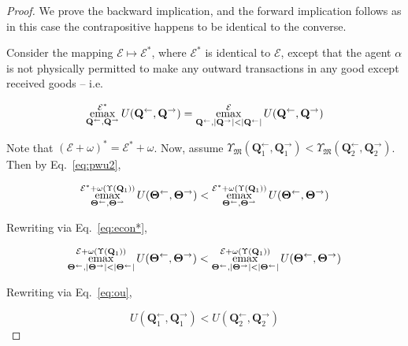 \documentclass[smallextended]{svjour3}
\newcommand{\economy}{\ensuremath{\mathcal{E}}}
\newcommand{\emax}{\ensuremath{\operatornamewithlimits{emax}}}
\newcommand{\quantl}{\ensuremath{\mathbf{Q}}} %
\newcommand{\quantg}{\ensuremath{\mathbf{\Theta}}} %
\newcommand{\agenta}{\ensuremath{\alpha}}
\newcommand{\agentz}{\ensuremath{\omega}}
\newcommand{\money}{\ensuremath{\mathfrak{M}}}
\newcommand{\utility}{\ensuremath{U}}
\newcommand{\outility}{\ensuremath{\Upsilon}}
\begin{document}
\begin{proof}
    We prove the backward implication, and the forward implication follows as in this case the contrapositive happens to be identical to the converse.
    
    Consider the mapping $\economy\mapsto\economy^*$, where $\economy^*$ is identical to $\economy$, except that the agent $\agenta$ is not physically permitted to make any outward transactions in any good except received goods -- i.e.
    
    \begin{equation}
        \label{eq:econ*}
        \emax\limits_{\quantl^\leftarrow, \quantl^\rightarrow}^{\economy^*} \utility(\quantl^\leftarrow, \quantl^\rightarrow) = 
        \emax\limits_{\quantl^\leftarrow, |\quantl^\rightarrow|<|\quantl^\leftarrow|}^{\economy} \utility(\quantl^\leftarrow, \quantl^\rightarrow)
    \end{equation}
    
    Note that $(\economy + \agentz)^* = \economy^* + \agentz$. Now, assume $\outility_\money(\quantl_1^\leftarrow, \quantl_1^\rightarrow)<\outility_\money(\quantl_2^\leftarrow, \quantl_2^\rightarrow)$. Then by Eq.~\ref{eq:pwu2}, 
    
    \begin{equation*}
        \emax\limits_{\quantg^\leftarrow, \quantg^\rightarrow}^{\economy^* + \agentz(\outility(\quantl_1))} \utility(\quantg^\leftarrow, \quantg^\rightarrow) < \emax\limits_{\quantg^\leftarrow, \quantg^\rightarrow}^{\economy^*+\agentz(\outility(\quantl_1))} \utility(\quantg^\leftarrow, \quantg^\rightarrow)
    \end{equation*}
    
    Rewriting via Eq.~\ref{eq:econ*}, 
    
    \begin{equation*}
        \emax\limits_{\quantg^\leftarrow, |\quantg^\rightarrow|<|\quantg^\leftarrow|}^{\economy + \agentz(\outility(\quantl_1))} \utility(\quantg^\leftarrow, \quantg^\rightarrow) < \emax\limits_{\quantg^\leftarrow, |\quantg^\rightarrow|<|\quantg^\leftarrow|}^{\economy+\agentz(\outility(\quantl_1))} \utility(\quantg^\leftarrow, \quantg^\rightarrow)
    \end{equation*}
    
    Rewriting via Eq.~\ref{eq:ou},
    
    \begin{equation*}
        \utility(\quantl_1^\leftarrow, \quantl_1^\rightarrow) < \utility(\quantl_2^\leftarrow, \quantl_2^\rightarrow) 
    \end{equation*}
\end{proof}
\end{document}
